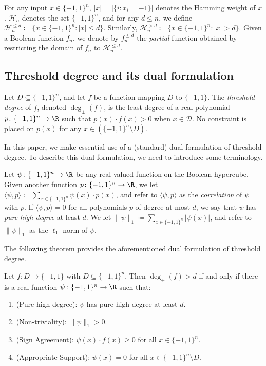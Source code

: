 \documentclass{toc}
\newcommand{\bits}{\{-1,1\}}
\begin{document}
For any input $x \in \bits^n$, $|x|=|\{i \colon x_i=-1\}|$ denotes the Hamming weight of $x$.
$\mathcal{H}_n$ denotes the set $\bits^n$, and 
for any $d \leq n$, we define $\mathcal{H}_n^{\leq d} \coloneqq  \{x \in \bits^n \colon |x| \leq d\}$.
Similarly,  $\mathcal{H}_n^{> d} \coloneqq  \{x \in \bits^n \colon |x| > d\}$.
Given a Boolean function $f_n$, we denote by $f_n^{\leq d}$ the \emph{partial} function obtained
by restricting the domain of $f_n$ to $\mathcal{H}_n^{\leq d}$.




\subsection{Threshold degree and its dual formulation}

\begin{definition} \label{def:tdeg}
	Let $D \subseteq \{-1, 1\}^n$, and let $f$ be a function mapping $D$ to $\{-1,1\}$.
	The \emph{threshold degree} of $f$, denoted $\deg_{\pm}(f)$, is the least degree of a real polynomial $p \colon \bits^n \to \R$ such that $p(x) \cdot f(x) > 0 $ when $x \in \mathcal{D}$.
	No constraint is placed on $p(x)$ for any $x \in (\bits^n \setminus D)$. 	
\end{definition}


In this paper, we make essential use of a (standard) dual formulation of threshold degree. To describe
this dual formulation, we need to introduce some terminology.

\begin{definition}
	Let $\psi \colon \bits^n \to \R$ be any real-valued function on the Boolean hypercube. 
	Given another function $p \colon \bits^n \to \R$, we let $\langle \psi, p\rangle \coloneqq  \sum_{x \in \bits^n} \psi(x) \cdot p(x)$,
	and refer to $\langle \psi, p\rangle$ as the \emph{correlation} of $\psi$ with $p$. 
	If $\langle \psi, p\rangle = 0$ for all polynomials $p$ of degree at most $d$, we say that $\psi$ has \emph{pure high degree} at least $d$.
	We let $\|\psi\|_1 \coloneqq  \sum_{x \in \bits^n} |\psi(x)|$, and refer to $\|\psi\|_1$ as the $\ell_1$-norm of $\psi$.
\end{definition}


The following theorem provides the aforementioned dual formulation of threshold degree.
\begin{theorem}\label{theorem:tdegdual}
	
	Let $f:D \to \{-1,1\}$ with $D \subseteq \{-1,1\}^n$. Then $\deg_{\pm}(f) > d$ if and only if there is a real function $\psi: \bits^n \to \R$ such that:
	\begin{enumerate}
		\item (Pure high degree): $\psi$ has pure high degree at least $d$.
		\item (Non-triviality): $\|\psi\|_1 > 0$.
		\item (Sign Agreement): $\psi(x) \cdot f(x) \ge 0$ for all $x \in \bits^n$.
		\item (Appropriate Support): $\psi(x)=0$ for all $x \in \bits^n \setminus D$.
	\end{enumerate}
\end{theorem}
\end{document}
